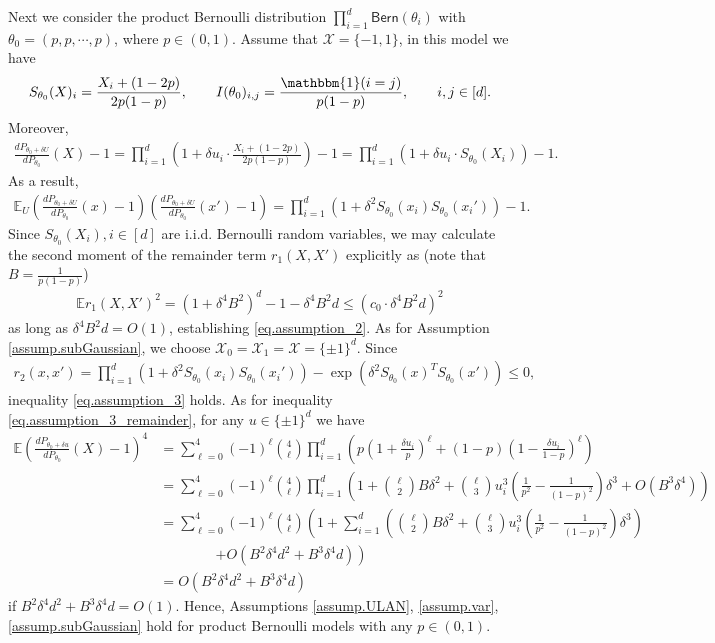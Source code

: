 \documentclass[final,12pt]{colt2018} %
\def \bE {\mathbb{E}}
\newcommand{\calX}{{\mathcal{X}}}
\begin{document}
Next we consider the product Bernoulli distribution $\prod_{i=1}^d \mathsf{Bern}(\theta_i)$ with $\theta_0=(p,p,\cdots,p)$, where $p\in (0,1)$. Assume that $\calX=\{-1,1\}$, in this model we have 
\begin{align*}
S_{\theta_0}(X)_i = \frac{X_i+(1-2p)}{2p(1-p)}, \qquad I(\theta_0)_{i,j} = \frac{\mathbbm{1}(i=j)}{p(1-p)}, \qquad i,j\in [d].
\end{align*}
Moreover, 
\begin{align*}
\frac{dP_{\theta_0+\delta U}}{dP_{\theta_0}}(X) - 1 = \prod_{i=1}^d \left(1 + \delta u_i\cdot \frac{X_i+(1-2p)}{2p(1-p)}\right) - 1 = \prod_{i=1}^d \left(1 + \delta u_i\cdot S_{\theta_0}(X_i)\right) - 1.
\end{align*}
As a result, 
\begin{align*}
\bE_U \left( \frac{dP_{\theta_0+\delta U}}{dP_{\theta_0}}(x) - 1 \right)\left( \frac{dP_{\theta_0+\delta U}}{dP_{\theta_0}}(x') - 1 \right) = \prod_{i=1}^d (1+\delta^2 S_{\theta_0}(x_i)S_{\theta_0}(x_i'))- 1. 
\end{align*}
Since $S_{\theta_0}(X_i), i\in [d]$ are i.i.d. Bernoulli random variables, we may calculate the second moment of the remainder term $r_1(X,X')$ explicitly as (note that $B= \frac{1}{p(1-p)}$)
\begin{align*}
\bE r_1(X,X')^2 = (1+ \delta^4 B^2)^d - 1 -  \delta^4 B^2d \le (c_0\cdot \delta^4B^2d)^2
\end{align*}
as long as $\delta^4B^2d=O(1)$, establishing \eqref{eq.assumption_2}. As for Assumption \ref{assump.subGaussian}, we choose $\calX_0=\calX_1=\calX=\{\pm 1\}^d$. Since
\begin{align*}
r_2(x,x') = \prod_{i=1}^d (1+\delta^2 S_{\theta_0}(x_i)S_{\theta_0}(x_i'))- \exp(\delta^2 S_{\theta_0}(x)^TS_{\theta_0}(x')) \le 0, 
\end{align*} 
inequality \eqref{eq.assumption_3} holds. As for inequality \eqref{eq.assumption_3_remainder}, for any $u\in \{\pm 1\}^d$ we have
\begin{align*}
\bE\left(\frac{dP_{\theta_0+\delta u}}{dP_{\theta_0}}(X) - 1\right)^4 &= \sum_{\ell=0}^4 (-1)^{\ell}\binom{4}{\ell} \prod_{i=1}^d\left( p\left(1+\frac{\delta u_i}{p}\right)^{\ell} + (1-p)\left(1-\frac{\delta u_i}{1-p}\right)^{\ell} \right) \\
&= \sum_{\ell=0}^4 (-1)^{\ell}\binom{4}{\ell} \prod_{i=1}^d\left( 1 + \binom{\ell}{2}B\delta^2 + \binom{\ell}{3}u_i^3 \left(\frac{1}{p^2}-\frac{1}{(1-p)^2}\right)\delta^3 + O(B^3\delta^4)\right) \\
&= \sum_{\ell=0}^4 (-1)^{\ell}\binom{4}{\ell} \left(1  + \sum_{i=1}^d \left( \binom{\ell}{2}B\delta^2 + \binom{\ell}{3}u_i^3 \left(\frac{1}{p^2}-\frac{1}{(1-p)^2}\right)\delta^3 \right) \right.\\
&\qquad\qquad\left. + O(B^2\delta^4d^2+B^3\delta^4d) \right) \\
&= O(B^2\delta^4d^2+B^3\delta^4d)
\end{align*}
if $B^2\delta^4d^2+B^3\delta^4d=O(1)$. Hence, Assumptions \ref{assump.ULAN}, \ref{assump.var}, \ref{assump.subGaussian} hold for product Bernoulli models with any $p\in (0,1)$. 
\end{document}
